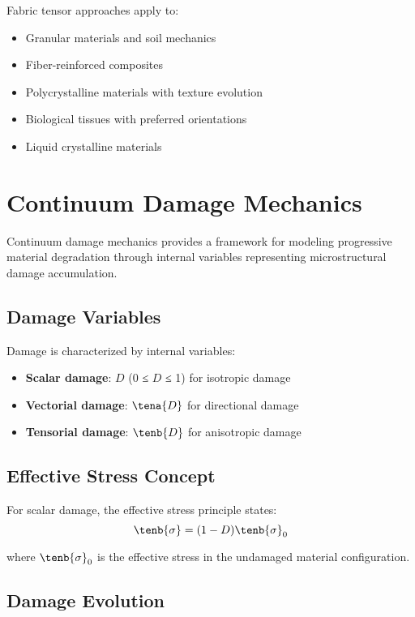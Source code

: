 Fabric tensor approaches apply to:
\begin{itemize}
\item Granular materials and soil mechanics
\item Fiber-reinforced composites
\item Polycrystalline materials with texture evolution
\item Biological tissues with preferred orientations
\item Liquid crystalline materials
\end{itemize}

\section{Continuum Damage Mechanics}

Continuum damage mechanics provides a framework for modeling progressive material degradation through internal variables representing microstructural damage accumulation.

\subsection{Damage Variables}

Damage is characterized by internal variables:
\begin{itemize}
\item \textbf{Scalar damage}: $D$ (0 ≤ $D$ ≤ 1) for isotropic damage
\item \textbf{Vectorial damage}: $\tena{D}$ for directional damage
\item \textbf{Tensorial damage}: $\tenb{D}$ for anisotropic damage
\end{itemize}

\subsection{Effective Stress Concept}

For scalar damage, the effective stress principle states:
\begin{equation}
\tenb{\sigma} = (1-D) \tenb{\sigma}_0
\end{equation}

where $\tenb{\sigma}_0$ is the effective stress in the undamaged material configuration.

\subsection{Damage Evolution}

